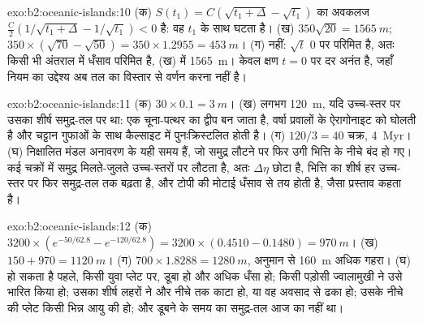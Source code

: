 \begin{solution}{exo:b2:oceanic-islands:10}
(क) $S(t_1) = C(\sqrt{t_1 + \Delta} - \sqrt{t_1})$ का अवकलज $\frac C2(1/\sqrt{t_1 +
\Delta} - 1/\sqrt{t_1}) < 0$ है: वह $t_1$ के साथ घटता है। (ख) $350\sqrt{20} = \qty{1565}{m}$; $350\times
(\sqrt{70} - \sqrt{50}) = 350\times1.2955 = \qty{453}{m}$। (ग) नहीं: $\sqrt t$ $0$ पर परिमित है, अतः
किसी भी अंतराल में धँसाव परिमित है, (ख) में \qty{1565}{m}। केवल क्षण $t = 0$ पर दर
अनंत है, जहाँ नियम का उद्देश्य अब तल का विस्तार से वर्णन करना नहीं है।
\end{solution}

\begin{solution}{exo:b2:oceanic-islands:11}
(क) $30\times0.1 = \qty{3}{m}$। (ख) लगभग \qty{120}{m}, यदि उच्च-स्तर पर उसका शीर्ष समुद्र-तल पर था:
 एक चूना-पत्थर का द्वीप बन जाता है, वर्षा प्रवालों के ऐरागोनाइट को घोलती है और
चट्टान गुफाओं के साथ कैल्साइट में पुनःक्रिस्टलित होती है। (ग) $120/3 = 40$ चक्र, \qty{4}{Myr}। (घ) निक्षालित
मंडल अनावरण के यही समय हैं, जो समुद्र लौटने पर फिर उगी भित्ति के नीचे बंद हो गए।
कई चक्रों में समुद्र मिलते-जुलते उच्च-स्तरों पर लौटता है, अतः $\Delta\eta$ छोटा है, भित्ति का शीर्ष
हर उच्च-स्तर पर फिर समुद्र-तल तक बढ़ता है, और टोपी की मोटाई धँसाव से तय होती है, जैसा
प्रस्ताव कहता है।
\end{solution}

\begin{solution}{exo:b2:oceanic-islands:12}
(क) $3200\times(e^{-50/62.8} - e^{-120/62.8}) = 3200\times(0.4510 - 0.1480) = \qty{970}{m}$।
(ख) $150 + 970 = \qty{1120}{m}$। (ग) $700\times1.8288 = \qty{1280}{m}$, अनुमान से \qty{160}{m} अधिक
गहरा। (घ) हो सकता है  पहले, किसी युवा प्लेट पर, डूबा हो और अधिक धँसा हो; किसी पड़ोसी
ज्वालामुखी ने उसे भारित किया हो; उसका शीर्ष लहरों ने और नीचे तक काटा हो, या वह अवसाद से ढका हो;
उसके नीचे की प्लेट किसी भिन्न आयु की हो; और डूबने के समय का समुद्र-तल
आज का नहीं था।
\end{solution}

